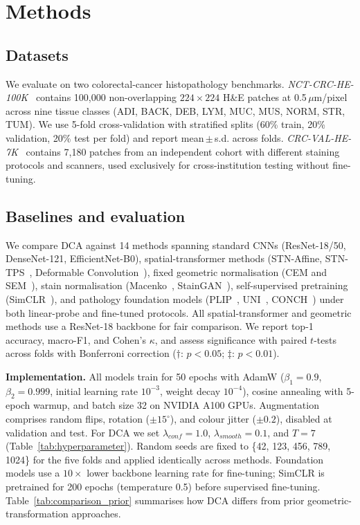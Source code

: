 \documentclass[pdflatex,sn-nature]{sn-jnl}%
\theoremstyle{thmstyleone}%
\theoremstyle{thmstyletwo}%
\theoremstyle{thmstylethree}%
\begin{document}
\section{Methods}
\label{sec:method}

\subsection{Datasets}

We evaluate on two colorectal-cancer histopathology benchmarks.
\textit{NCT-CRC-HE-100K}~\cite{nct_dataset} contains 100{,}000 non-overlapping
$224\times224$ H\&E patches at 0.5\,$\mu$m/pixel across nine tissue classes
(ADI, BACK, DEB, LYM, MUC, MUS, NORM, STR, TUM). We use 5-fold cross-validation
with stratified splits (60\% train, 20\% validation, 20\% test per fold) and
report mean\,$\pm$\,s.d. across folds. \textit{CRC-VAL-HE-7K}~\cite{nct_dataset}
contains 7{,}180 patches from an independent cohort with different staining
protocols and scanners, used exclusively for cross-institution testing without
fine-tuning.

\subsection{Baselines and evaluation}

We compare DCA against 14 methods spanning standard CNNs (ResNet-18/50,
DenseNet-121, EfficientNet-B0), spatial-transformer methods (STN-Affine,
STN-TPS~\cite{jaderberg2015spatial}, Deformable
Convolution~\cite{dai2017deformable}), fixed geometric normalisation (CEM and
SEM~\cite{huang2024surface}), stain normalisation
(Macenko~\cite{macenko2009method}, StainGAN~\cite{shaban2019staingan}),
self-supervised pretraining (SimCLR~\cite{chen2020simple}), and pathology
foundation models (PLIP~\cite{huang2023plip}, UNI~\cite{chen2024uni},
CONCH~\cite{lu2024conch}) under both linear-probe and fine-tuned protocols. All
spatial-transformer and geometric methods use a ResNet-18 backbone for fair
comparison. We report top-1 accuracy, macro-F1, and Cohen's $\kappa$, and assess
significance with paired $t$-tests across folds with Bonferroni correction
($\dagger$: $p<0.05$; $\ddagger$: $p<0.01$).

\textbf{Implementation.} All models train for 50 epochs with AdamW
($\beta_1=0.9$, $\beta_2=0.999$, initial learning rate $10^{-3}$, weight decay
$10^{-4}$), cosine annealing with 5-epoch warmup, and batch size 32 on NVIDIA
A100 GPUs. Augmentation comprises random flips, rotation ($\pm15^\circ$), and
colour jitter ($\pm0.2$), disabled at validation and test. For DCA we set
$\lambda_{conf}=1.0$, $\lambda_{smooth}=0.1$, and $T=7$ (Table~\ref{tab:hyperparameter}).
Random seeds are fixed to \{42, 123, 456, 789, 1024\} for the five folds and
applied identically across methods. Foundation models use a $10\times$ lower
backbone learning rate for fine-tuning; SimCLR is pretrained for 200 epochs
(temperature 0.5) before supervised fine-tuning. Table~\ref{tab:comparison_prior}
summarises how DCA differs from prior geometric-transformation approaches.
\end{document}
